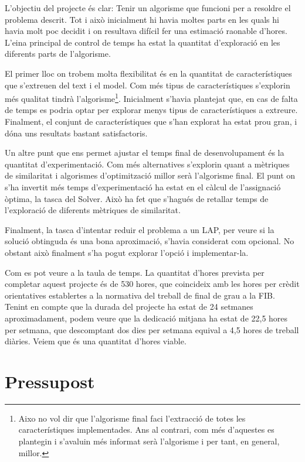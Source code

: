 L'objectiu del projecte és clar: Tenir un algorisme que funcioni per a resoldre el problema descrit. Tot i això inicialment hi havia moltes parts en les quals hi havia molt poc decidit i on resultava difícil fer una estimació raonable d'hores. L'eina principal de control de temps ha estat la quantitat d'exploració en les diferents parts de l'algorisme. 

El primer lloc on trobem molta flexibilitat és en la quantitat de característiques que s'extreuen del text i el model. Com més tipus de característiques s'explorin més qualitat tindrà l'algorisme\footnote{Aixo no vol dir que l'algorisme final faci l'extracció de totes les característiques implementades. Ans al contrari, com més d'aquestes es plantegin i s'avaluin més informat serà l'algorisme i per tant, en general, millor.}. Inicialment s'havia plantejat que, en cas de falta de temps es podria optar per explorar menys tipus de característiques a extreure. Finalment, el conjunt de característiques que s'han explorat ha estat prou gran, i dóna uns resultats bastant satisfactoris.

Un altre punt que ens permet ajustar el temps final de desenvolupament és la quantitat d'experimentació. Com més alternatives s'explorin quant a mètriques de similaritat i algorismes d'optimització millor serà l'algorisme final. El punt on s'ha invertit més temps d'experimentació ha estat en el càlcul de l'assignació òptima, la tasca del Solver. Això ha fet que s'hagués de retallar temps de l'exploració de diferents mètriques de similaritat.

Finalment, la tasca d'intentar reduir el problema a un LAP, per veure si la solució obtinguda és una bona aproximació, s'havia considerat com opcional. No obstant això finalment s'ha pogut explorar l'opció i implementar-la.

Com es pot veure a la taula de temps. La quantitat d'hores prevista per completar aquest projecte és de 530 hores, que coincideix amb les hores per crèdit orientatives establertes a la normativa del treball de final de grau a la FIB. Tenint en compte que la durada del projecte ha estat de 24 setmanes aproximadament, podem veure que la dedicació mitjana ha estat de 22,5 hores per setmana, que descomptant dos dies per setmana equival a 4,5 hores de treball diàries. Veiem que és una quantitat d'hores viable.


\section{Pressupost}
\label{pressupost}

